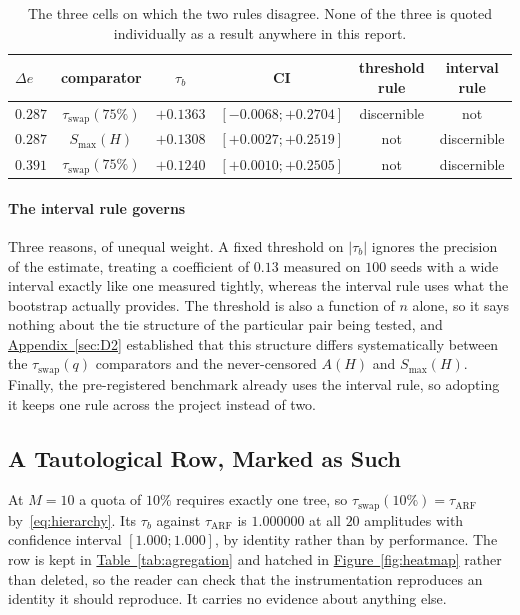 \documentclass[10pt,conference]{IEEEtran}
\theoremstyle{definition}
\begin{document}
\begin{table}[t]
  \centering
\caption{The three cells on which the two rules disagree. None of the three is quoted
  individually as a result anywhere in this report.}
\label{tab:regles}
  \begin{tabular}{lccccc}
    \toprule
    $\Delta e$ & comparator & $\tau_b$ & CI & threshold rule & interval rule \\
    \midrule
    $0.287$ & $\tau_{\mathrm{swap}}(75\%)$ & $+0.1363$ & $[-0.0068 ; +0.2704]$ & discernible & not \\
    $0.287$ & $S_{\max}(H)$                & $+0.1308$ & $[+0.0027 ; +0.2519]$ & not & discernible \\
    $0.391$ & $\tau_{\mathrm{swap}}(75\%)$ & $+0.1240$ & $[+0.0010 ; +0.2505]$ & not & discernible \\
    \bottomrule
  \end{tabular}

\end{table}

\paragraph{The interval rule governs} Three reasons, of unequal weight. A fixed threshold
on $|\tau_b|$ ignores the precision of the estimate, treating a coefficient of $0.13$
measured on $100$ seeds with a wide interval exactly like one measured tightly, whereas
the interval rule uses what the bootstrap actually provides. The threshold is also a
function of $n$ alone, so it says nothing about the tie structure of the particular pair
being tested, and \hyperref[sec:D2]{Appendix~\ref*{sec:D2}} established that this structure differs
systematically between the $\tau_{\mathrm{swap}}(q)$ comparators and the never-censored
$A(H)$ and $S_{\max}(H)$. Finally, the pre-registered benchmark already uses the interval
rule, so adopting it keeps one rule across the project instead of two.

\subsection{A Tautological Row, Marked as Such}
\label{sec:d3:tauto}

At $M = 10$ a quota of $10\%$ requires exactly one tree, so
$\tau_{\mathrm{swap}}(10\%) = \tau_{\mathrm{ARF}}$ by~\eqref{eq:hierarchy}. Its $\tau_b$ against $\tau_{\mathrm{ARF}}$ is $1.000000$ at all
$20$ amplitudes with confidence interval $[1.000 ; 1.000]$, by identity rather than by
performance. The row is kept in \hyperref[tab:agregation]{Table~\ref*{tab:agregation}} and hatched in
\hyperref[fig:heatmap]{Figure~\ref*{fig:heatmap}} rather than deleted, so the reader can check that the
instrumentation reproduces an identity it should reproduce. It carries no evidence about
anything else.
\end{document}
